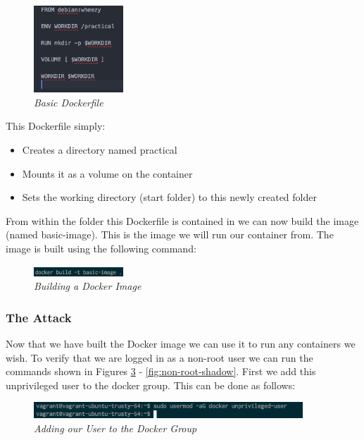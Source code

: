 \documentclass{article}
\begin{document}
\begin{figure}[!h]
\centering
\includegraphics*[width=0.3\textwidth]{components/images/dockerfile}
\caption{\em Basic Dockerfile}
\label{fig:dockerfile}
\end{figure}

This Dockerfile simply:

\begin{itemize}
  \item Creates a directory named practical
  \item Mounts it as a volume on the container
  \item Sets the working directory (start folder) to this newly created folder
\end{itemize}

From within the folder this Dockerfile is contained in we can now build the image (named basic-image). This is the image we will run our container from. The image is built using the following command:

\begin{figure}[!h]
\centering
\includegraphics*[width=0.3\textwidth]{components/images/build-image}
\caption{\em Building a Docker Image}
\label{fig:build}
\end{figure}

\newpage
\subsubsection{The Attack}
\label{subs:attack}
Now that we have built the Docker image we can use it to run any containers we wish. To verify that we are logged in as a non-root user we can run the commands shown in Figures \ref{fig:add-user} - \ref{fig:non-root-shadow}. First we add this unprivileged user to the docker group. This can be done as follows:

\begin{figure}[!h]
\centering
\includegraphics*[width=0.9\textwidth]{components/images/add-user-to-group}
\caption{\em Adding our User to the Docker Group}
\label{fig:add-user}
\end{figure}
\end{document}
